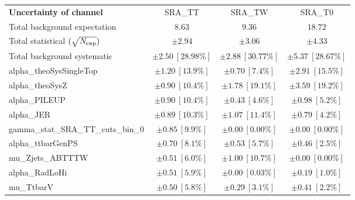 
\begin{table}
\begin{center}
\setlength{\tabcolsep}{0.0pc}
\begin{tabular*}{\textwidth}{@{\extracolsep{\fill}}lccc}
\noalign{\smallskip}\hline\noalign{\smallskip}
{\bf Uncertainty of channel}                                    & SRA\_TT            & SRA\_TW            & SRA\_T0            \\
\noalign{\smallskip}\hline\noalign{\smallskip}
Total background expectation             &  $8.63$        &  $9.36$        &  $18.72$       \\
\noalign{\smallskip}\hline\noalign{\smallskip}
Total statistical $(\sqrt{N_{\rm exp}})$              & $\pm 2.94$        & $\pm 3.06$        & $\pm 4.33$       \\
Total background systematic               & $\pm 2.50\ [28.98\%] $        & $\pm 2.88\ [30.77\%] $        & $\pm 5.37\ [28.67\%] $             \\
\noalign{\smallskip}\hline\noalign{\smallskip}
\noalign{\smallskip}\hline\noalign{\smallskip}
alpha\_theoSysSingleTop         & $\pm 1.20\ [13.9\%] $          & $\pm 0.70\ [7.4\%] $          & $\pm 2.91\ [15.5\%] $       \\
alpha\_theoSysZ         & $\pm 0.90\ [10.4\%] $          & $\pm 1.78\ [19.1\%] $          & $\pm 3.59\ [19.2\%] $       \\
alpha\_PILEUP         & $\pm 0.90\ [10.4\%] $          & $\pm 0.43\ [4.6\%] $          & $\pm 0.98\ [5.2\%] $       \\
alpha\_JER         & $\pm 0.89\ [10.3\%] $          & $\pm 1.07\ [11.4\%] $          & $\pm 0.79\ [4.2\%] $       \\
gamma\_stat\_SRA\_TT\_cuts\_bin\_0         & $\pm 0.85\ [9.9\%] $          & $\pm 0.00\ [0.00\%] $          & $\pm 0.00\ [0.00\%] $       \\
alpha\_ttbarGenPS         & $\pm 0.70\ [8.1\%] $          & $\pm 0.53\ [5.7\%] $          & $\pm 0.46\ [2.5\%] $       \\
mu\_Zjets\_ABTTTW         & $\pm 0.51\ [6.0\%] $          & $\pm 1.00\ [10.7\%] $          & $\pm 0.00\ [0.00\%] $       \\
alpha\_RadLoHi         & $\pm 0.51\ [5.9\%] $          & $\pm 0.00\ [0.03\%] $          & $\pm 0.19\ [1.0\%] $       \\
mu\_TtbarV         & $\pm 0.50\ [5.8\%] $          & $\pm 0.29\ [3.1\%] $          & $\pm 0.41\ [2.2\%] $       \\

\end{tabular*}
\end{center}
\end{table}
